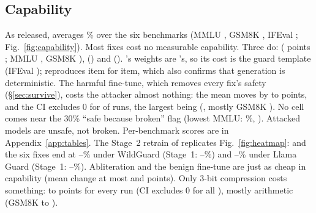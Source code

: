 \subsection{Capability\stagetwo}
\label{sec:capability}
As released,  averages \% over the six benchmarks (MMLU , GSM8K
, IFEval ; Fig.~\ref{fig:capability}). Most fixes cost no measurable
capability. Three do:  ( points ; MMLU , GSM8K
),  () and  (). 's weights are
's, so its cost is the guard template (IFEval );  reproduces
 item for item, which also confirms that generation is deterministic. The harmful fine-tune, which removes
every fix's safety (\S\ref{sec:survive}), costs the attacker almost nothing: the mean moves by  to
 points, and the CI excludes 0 for  of  runs, the largest
being  (, mostly GSM8K ). No cell comes near the 30\% ``safe because
broken'' flag (lowest MMLU: \%, ). Attacked models are unsafe, not broken.
Per-benchmark scores are in Appendix~\ref{app:tables}.
The Stage~2 retrain of  replicates Fig.~\ref{fig:heatmap}:  and the six fixes end at
--\% under WildGuard (Stage~1: --\%) and
--\% under Llama Guard (Stage~1: --\%). Abliteration and the benign fine-tune are just as cheap in
capability (mean change at most  and  points). Only 3-bit compression costs
something:  to  points for every run (CI excludes 0 for all
), mostly arithmetic (GSM8K  to ).

